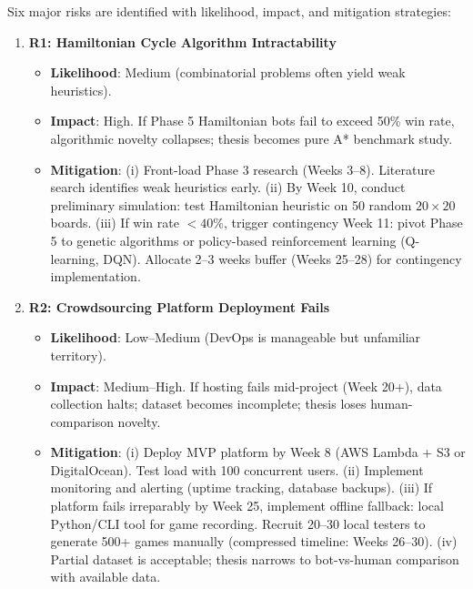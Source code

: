 \documentclass[11pt,a4paper]{article}
\begin{document}
Six major risks are identified with likelihood, impact, and mitigation strategies:

\begin{enumerate}
    \item \textbf{R1: Hamiltonian Cycle Algorithm Intractability}
    \begin{itemize}
        \item \textbf{Likelihood}: Medium (combinatorial problems often yield weak heuristics).
        \item \textbf{Impact}: High. If Phase 5 Hamiltonian bots fail to exceed 50\% win rate, algorithmic novelty collapses; thesis becomes pure A* benchmark study.
        \item \textbf{Mitigation}: (i) Front-load Phase 3 research (Weeks 3--8). Literature search identifies weak heuristics early. (ii) By Week 10, conduct preliminary simulation: test Hamiltonian heuristic on 50 random $20 \times 20$ boards. (iii) If win rate $< 40\%$, trigger contingency Week 11: pivot Phase 5 to genetic algorithms or policy-based reinforcement learning (Q-learning, DQN). Allocate 2--3 weeks buffer (Weeks 25--28) for contingency implementation.
    \end{itemize}

    \item \textbf{R2: Crowdsourcing Platform Deployment Fails}
    \begin{itemize}
        \item \textbf{Likelihood}: Low--Medium (DevOps is manageable but unfamiliar territory).
        \item \textbf{Impact}: Medium--High. If hosting fails mid-project (Week 20+), data collection halts; dataset becomes incomplete; thesis loses human-comparison novelty.
        \item \textbf{Mitigation}: (i) Deploy MVP platform by Week 8 (AWS Lambda + S3 or DigitalOcean). Test load with 100 concurrent users. (ii) Implement monitoring and alerting (uptime tracking, database backups). (iii) If platform fails irreparably by Week 25, implement offline fallback: local Python/CLI tool for game recording. Recruit 20--30 local testers to generate 500+ games manually (compressed timeline: Weeks 26--30). (iv) Partial dataset is acceptable; thesis narrows to bot-vs-human comparison with available data.
    \end{itemize}


\end{enumerate}
\end{document}
